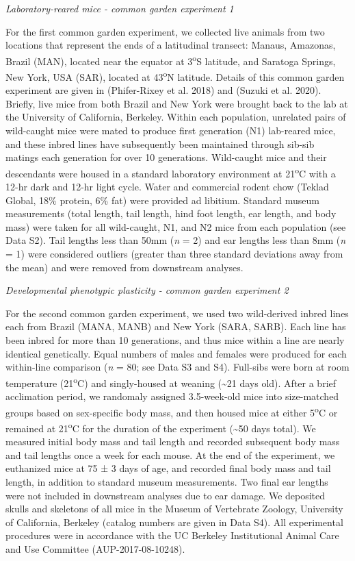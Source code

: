 \documentclass[]{article}
\begin{document}
\vspace{3.5mm}

\noindent\emph{Laboratory-reared mice - common garden experiment 1}

For the first common garden experiment, we collected live animals from
two locations that represent the ends of a latitudinal transect: Manaus,
Amazonas, Brazil (MAN), located near the equator at
3\textsuperscript{o}S latitude, and Saratoga Springs, New York, USA
(SAR), located at 43\textsuperscript{o}N latitude. Details of this
common garden experiment are given in (Phifer-Rixey et al. 2018) and
(Suzuki et al. 2020). Briefly, live mice from both Brazil and New York
were brought back to the lab at the University of California, Berkeley.
Within each population, unrelated pairs of wild-caught mice were mated
to produce first generation (N1) lab-reared mice, and these inbred lines
have subsequently been maintained through sib-sib matings each
generation for over 10 generations. Wild-caught mice and their
descendants were housed in a standard laboratory environment at
21\textsuperscript{o}C with a 12-hr dark and 12-hr light cycle. Water
and commercial rodent chow (Teklad Global, 18\% protein, 6\% fat) were
provided ad libitium. Standard museum measurements (total length, tail
length, hind foot length, ear length, and body mass) were taken for all
wild-caught, N1, and N2 mice from each population (see Data S2). Tail
lengths less than 50mm (\emph{n} = 2) and ear lengths less than 8mm
(\emph{n} = 1) were considered outliers (greater than three standard
deviations away from the mean) and were removed from downstream
analyses.

\vspace{3.5mm}

\noindent\emph{Developmental phenotypic plasticity - common garden
experiment 2}

For the second common garden experiment, we used two wild-derived inbred
lines each from Brazil (MANA, MANB) and New York (SARA, SARB). Each line
has been inbred for more than 10 generations, and thus mice within a
line are nearly identical genetically. Equal numbers of males and
females were produced for each within-line comparison (\emph{n} = 80;
see Data S3 and S4). Full-sibs were born at room temperature
(21\textsuperscript{o}C) and singly-housed at weaning
(\textasciitilde{}21 days old). After a brief acclimation period, we
randomaly assigned 3.5-week-old mice into size-matched groups based on
sex-specific body mass, and then housed mice at either
5\textsuperscript{o}C or remained at 21\textsuperscript{o}C for the
duration of the experiment (\textasciitilde{}50 days total). We measured
initial body mass and tail length and recorded subsequent body mass and
tail lengths once a week for each mouse. At the end of the experiment,
we euthanized mice at 75 ± 3 days of age, and recorded final body mass
and tail length, in addition to standard museum measurements. Two final
ear lengths were not included in downstream analyses due to ear damage.
We deposited skulls and skeletons of all mice in the Museum of
Vertebrate Zoology, University of California, Berkeley (catalog numbers
are given in Data S4). All experimental procedures were in accordance
with the UC Berkeley Institutional Animal Care and Use Committee
(AUP-2017-08-10248).
\end{document}
